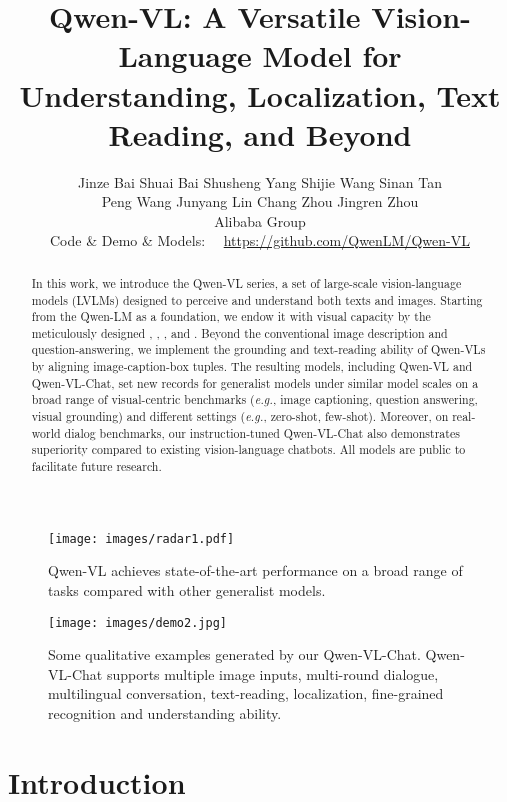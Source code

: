 \documentclass{article}
\title{
\textbf{
Qwen-VL: A Versatile Vision-Language Model for Understanding, Localization, Text Reading, and Beyond}
}
\author{
\large{}
Jinze Bai \hspace{6mm} Shuai Bai \hspace{6mm} Shusheng Yang \hspace{6mm} Shijie Wang \hspace{6mm} Sinan Tan\\
Peng Wang \hspace{6mm} Junyang Lin \hspace{6mm} Chang Zhou \hspace{6mm} Jingren Zhou
\\
\large{}
Alibaba Group
\\
\small{}
Code \& Demo \& Models: \ \ \url{https://github.com/QwenLM/Qwen-VL}
}
\date{}
\begin{document}
\doparttoc \faketableofcontents 

\maketitle

\begin{abstract}
\noindent
In this work, we introduce the Qwen-VL series, a set of large-scale vision-language models (LVLMs) designed to perceive and understand both texts and images.
Starting from the Qwen-LM as a foundation, we endow it with visual capacity by the meticulously designed , , , and .
Beyond the conventional image description and question-answering, we implement the grounding and text-reading ability of Qwen-VLs by aligning image-caption-box tuples.
The resulting models, including Qwen-VL and Qwen-VL-Chat, set new records for generalist models under similar model scales on a broad range of visual-centric benchmarks (\emph{e.g.}, image captioning, question answering, visual grounding) and different settings (\emph{e.g.}, zero-shot, few-shot).
Moreover, on real-world dialog benchmarks, our instruction-tuned Qwen-VL-Chat also demonstrates superiority compared to existing vision-language chatbots.
All models are public to facilitate future research.
\end{abstract}

{\let\thefootnote\relax{}}




\begin{figure*}[h]
\centering
\texttt{[image: images/radar1.pdf]}
   \caption{Qwen-VL achieves state-of-the-art performance on a broad range of tasks compared with other generalist models.}
\label{radar}
\end{figure*}

\begin{figure*}[t]
\centering
\texttt{[image: images/demo2.jpg]}
\caption{Some qualitative examples generated by our Qwen-VL-Chat. Qwen-VL-Chat supports multiple image inputs, multi-round dialogue, multilingual conversation, text-reading, localization, fine-grained recognition and understanding ability.}
\label{example}
\end{figure*}

\section{Introduction}
\end{document}

